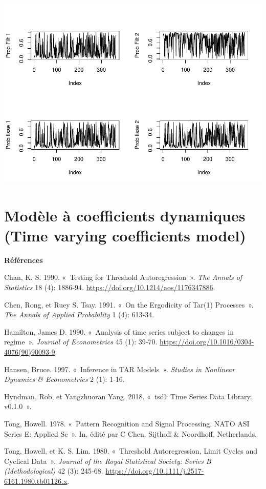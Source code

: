 \documentclass[
  french,
]{article}
\newlength{\cslhangindent}
\newlength{\cslentryspacingunit} %
\newenvironment{CSLReferences}[2] %
 {%
  \setlength{\parindent}{0pt}
  \ifodd #1
  \let\oldpar\par
  \def\par{\hangindent=\cslhangindent\oldpar}
  \fi
  \setlength{\parskip}{#2\cslentryspacingunit}
 }%
 {}
\begin{document}
\includegraphics{Chap3_files/figure-latex/unnamed-chunk-7-1.pdf}

\hypertarget{moduxe8le-uxe0-coefficients-dynamiques-time-varying-coefficients-model}{%
\section{Modèle à coefficients dynamiques (Time varying coefficients
model)}\label{moduxe8le-uxe0-coefficients-dynamiques-time-varying-coefficients-model}}

\textbf{Références}

\hypertarget{refs}{}
\begin{CSLReferences}{1}{0}
\leavevmode{}%
Chan, K. S. 1990. {«~{Testing for Threshold Autoregression}~»}.
\emph{The Annals of Statistics} 18 (4): 1886‑94.
\url{https://doi.org/10.1214/aos/1176347886}.

\leavevmode{}%
Chen, Rong, et Ruey S. Tsay. 1991. {«~On the Ergodicity of Tar(1)
Processes~»}. \emph{The Annals of Applied Probability} 1 (4): 613‑34.

\leavevmode{}%
Hamilton, James D. 1990. {«~Analysis of time series subject to changes
in regime~»}. \emph{Journal of Econometrics} 45 (1): 39‑70.
\url{https://doi.org/10.1016/0304-4076(90)90093-9}.

\leavevmode{}%
Hansen, Bruce. 1997. {«~Inference in TAR Models~»}. \emph{Studies in
Nonlinear Dynamics \& Econometrics} 2 (1): 1‑16.

\leavevmode{}%
Hyndman, Rob, et Yangzhuoran Yang. 2018. {«~tsdl: Time Series Data
Library. v0.1.0~»}.

\leavevmode{}%
Tong, Howell. 1978. {«~Pattern Recognition and Signal Processing. NATO
ASI Series E: Applied Sc~»}. In, édité par C Chen. Sijthoff \&
Noordhoff, Netherlands.

\leavevmode{}%
Tong, Howell, et K. S. Lim. 1980. {«~Threshold Autoregression, Limit
Cycles and Cyclical Data~»}. \emph{Journal of the Royal Statistical
Society: Series B (Methodological)} 42 (3): 245‑68.
\url{https://doi.org/10.1111/j.2517-6161.1980.tb01126.x}.

\end{CSLReferences}
\end{document}
